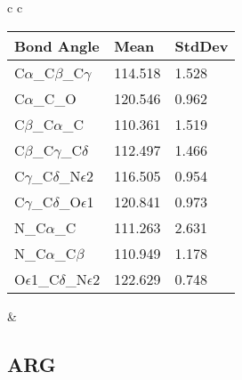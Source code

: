 \begin{longtable}{ c c }
\begin{tabular}{ l l l }
  Bond Angle   & Mean     & StdDev \\ \midrule
  C$\alpha$\_C$\beta$\_C$\gamma$ & 114.518 & 1.528\\
  C$\alpha$\_C\_O & 120.546 & 0.962\\
  C$\beta$\_C$\alpha$\_C & 110.361 & 1.519\\
  C$\beta$\_C$\gamma$\_C$\delta$ & 112.497 & 1.466\\
  C$\gamma$\_C$\delta$\_N$\epsilon$2 & 116.505 & 0.954\\
  C$\gamma$\_C$\delta$\_O$\epsilon$1 & 120.841 & 0.973\\
  N\_C$\alpha$\_C & 111.263 & 2.631\\
  N\_C$\alpha$\_C$\beta$ & 110.949 & 1.178\\
  O$\epsilon$1\_C$\delta$\_N$\epsilon$2 & 122.629 & 0.748\\
  \bottomrule
  \end{tabular}
  &
  \\
  
\end{longtable}    

\newpage
\subsection{ARG}

